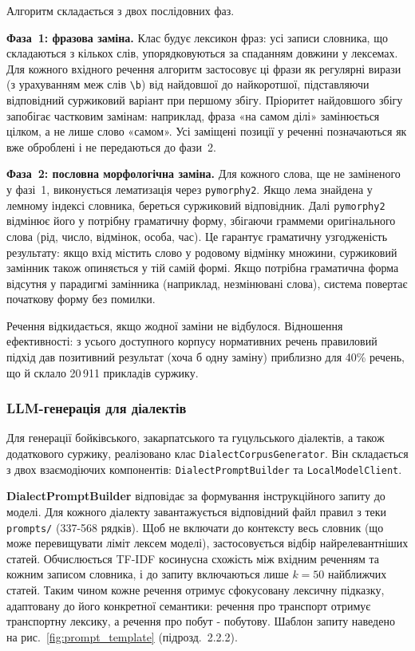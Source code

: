 \documentclass[14pt]{extarticle}
\begin{document}
Алгоритм складається з двох послідовних фаз.

\textbf{Фаза~1: фразова заміна.} Клас будує лексикон фраз: усі записи словника, що складаються з кількох слів, упорядковуються за спаданням довжини у лексемах. Для кожного вхідного речення алгоритм застосовує ці фрази як регулярні вирази (з урахуванням меж слів \texttt{\textbackslash b}) від найдовшої до найкоротшої, підставляючи відповідний суржиковий варіант при першому збігу. Пріоритет найдовшого збігу запобігає частковим замінам: наприклад, фраза «на самом ділі» замінюється цілком, а не лише слово «самом». Усі заміщені позиції у реченні позначаються як вже оброблені і не передаються до фази~2.

\textbf{Фаза~2: пословна морфологічна заміна.} Для кожного слова, ще не заміненого у фазі~1, виконується лематизація через \texttt{pymorphy2}. Якщо лема знайдена у лемному індексі словника, береться суржиковий відповідник. Далі \texttt{pymorphy2} відмінює його у потрібну граматичну форму, збігаючи граммеми оригінального слова (рід, число, відмінок, особа, час). Це гарантує граматичну узгодженість результату: якщо вхід містить слово у родовому відмінку множини, суржиковий замінник також опиняється у тій самій формі. Якщо потрібна граматична форма відсутня у парадигмі замінника (наприклад, незмінювані слова), система повертає початкову форму без помилки.

Речення відкидається, якщо жодної заміни не відбулося. Відношення ефективності: з усього доступного корпусу нормативних речень правиловий підхід дав позитивний результат (хоча б одну заміну) приблизно для 40\% речень, що й склало 20\,911 прикладів суржику.

\subsubsection{LLM-генерація для діалектів}

Для генерації бойківського, закарпатського та гуцульського діалектів, а також додаткового суржику, реалізовано клас \texttt{DialectCorpusGenerator}. Він складається з двох взаємодіючих компонентів: \texttt{DialectPromptBuilder} та \texttt{LocalModelClient}.

\textbf{DialectPromptBuilder} відповідає за формування інструкційного запиту до моделі. Для кожного діалекту завантажується відповідний файл правил з теки \texttt{prompts/} (337-568 рядків). Щоб не включати до контексту весь словник (що може перевищувати ліміт лексем моделі), застосовується відбір найрелевантніших статей. Обчислюється TF-IDF косинусна схожість між вхідним реченням та кожним записом словника, і до запиту включаються лише $k = 50$ найближчих статей. Таким чином кожне речення отримує сфокусовану лексичну підказку, адаптовану до його конкретної семантики: речення про транспорт отримує транспортну лексику, а речення про побут - побутову. Шаблон запиту наведено на рис.~\ref{fig:prompt_template} (підрозд.~2.2.2).
\end{document}
